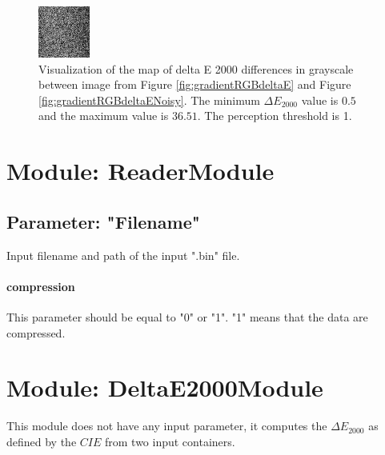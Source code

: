 \begin{figure}[!htb]
\begin{center}
\includegraphics[width=0.5\columnwidth]{./04_DeltaE2000Module/images/deltaE.png}
\caption{Visualization of the map of delta E 2000 differences in grayscale between image from Figure \ref{fig:gradientRGBdeltaE} and Figure \ref{fig:gradientRGBdeltaENoisy}. The minimum $\Delta{E_{2000}}$ value is $0.5$ and the maximum value is $36.51$. The perception threshold is 1.}\label{fig:mapDeltaE2000}
\end{center}
\end{figure}

\section{Module: ReaderModule}

\subsection{Parameter: "Filename"}

Input filename and path of the input ".bin" file.

\paragraph{compression}

This parameter should be equal to "0" or "1". "1" means that the data are compressed.

\section{Module: DeltaE2000Module}

This module does not have any input parameter, it computes the $\Delta{E_{2000}}$ as defined by the $CIE$ from two input containers.